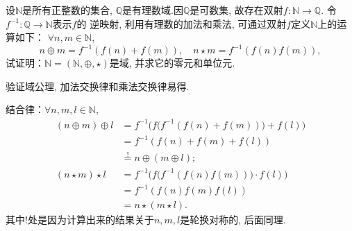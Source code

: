 \begin{problem}\label{ex:1.1.4}
    设$\mathbb{N}$是所有正整数的集合, $\mathbb{Q}$是有理数域.因$\mathbb{Q}$是可数集, 
故存在双射$f:\mathbb{N} \to \mathbb{Q}$. 令$f^{-1}:\mathbb{Q} \to \mathbb{N}$表示$f$的
逆映射, 利用有理数的加法和乘法, 可通过双射$f$定义$\mathbb{N}$上的运算如下：
$\forall n, m \in \mathbb{N}$, 
\[
    n \oplus m = f^{-1}(f(n) + f(m)), \quad n \star m = f^{-1}(f(n)f(m)),
\]
试证明：$\mathbb{N} = (\mathbb{N}, \oplus, \star)$是域, 并求它的零元和单位元.
\end{problem}

\begin{solution}
    验证域公理, 加法交换律和乘法交换律易得.

    结合律：$\forall n, m, l \in \mathbb{N}$,
\[
\begin{aligned}
    (n \oplus m) \oplus l &= f^{-1}\biggl(f\bigl(f^{-1}(f(n) + f(m))\bigr)+ f(l)\biggr)\\
    &= f^{-1}(f(n) + f(m) + f(l)) \\
    &\overset{!}= n \oplus (m \oplus l);\\
    (n \star m) \star l &= f^{-1}\biggl(f\bigl(f^{-1}(f(n)f(m))\bigr) \cdot f(l)\biggr)\\
    &= f^{-1}(f(n)f(m)f(l)) \\
    &= n \star (m \star l).
\end{aligned}
\]
其中!处是因为计算出来的结果关于$n, m, l$是轮换对称的, 后面同理.


\end{solution}
